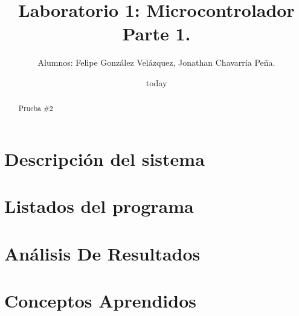\documentclass[12pt,letterpapers]{IEEEtran}
\date{today}
\title{Laboratorio 1: Microcontrolador Parte 1.}
\author{Alumnos: Felipe González Velázquez, Jonathan Chavarría Peña.}
\begin{document}
\renewcommand{\leftmark}{UNIVERSIDAD LATINA DE COSTA RICA -- BINGE-57 Arquitectura de Computadores}
\maketitle
	\begin{abstract}
	Prueba \#2
	\end{abstract}
\section{Descripción del sistema}

\section{Listados del programa}

\section{Análisis De Resultados}

\section{Conceptos Aprendidos}  
\end{document}
